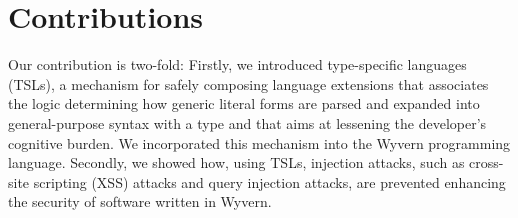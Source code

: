 \documentclass{sig-alternate}
\newcommand{\qs}[1]{}%
\begin{document}
\section{Contributions}
\qs{Clearly show how the results of your work contribute to computer science and explain the significance of those results.}

Our contribution is two-fold: Firstly, we introduced type-specific languages (TSLs), a mechanism for safely composing language extensions that associates the logic determining how generic literal forms are parsed and expanded into general-purpose syntax with a type and that aims at lessening the developer's cognitive burden. We incorporated this mechanism into the Wyvern programming language. Secondly, we showed how, using TSLs, injection attacks, such as cross-site scripting (XSS) attacks and query injection attacks, are prevented enhancing the security of software written in Wyvern.


\small

\end{document}
